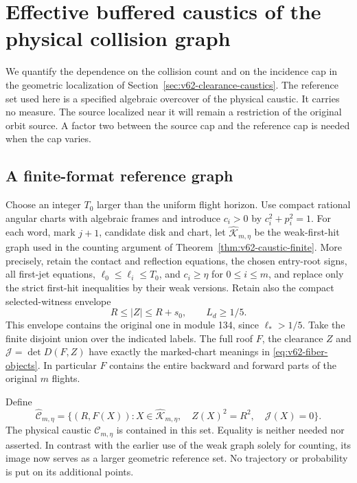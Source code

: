 \section{Effective buffered caustics of the physical collision graph}
\label{sec:v63-effective-caustics}
We quantify the dependence on the collision count and on the incidence
cap in the geometric localization of
Section~\ref{sec:v62-clearance-caustics}. The reference set used here
is a specified algebraic overcover of the physical caustic. It carries
no measure. The source localized near it will remain a restriction of
the original orbit source. A factor two between the source cap and the
reference cap is needed when the cap varies.

\subsection{A finite-format reference graph}
Choose an integer $T_0$ larger than the uniform flight horizon. Use
compact rational angular charts with algebraic frames and introduce
$c_i>0$ by $c_i^2+p_i^2=1$. For each word, mark $j+1$, candidate disk
and chart, let $\widehat{\mathcal K}_{m,\eta}$ be the weak-first-hit
graph used in the counting argument of
Theorem~\ref{thm:v62-caustic-finite}. More precisely, retain the contact
and reflection equations, the chosen entry-root signs, all first-jet
equations, $\ell_0\le\ell_i\le T_0$, and $c_i\ge\eta$ for
$0\le i\le m$, and replace only the strict first-hit inequalities by
their weak versions. Retain also the compact selected-witness envelope
\[
 R\le |Z|\le R+s_0,\qquad L_d\ge1/5.
\]
This envelope contains the original one in module 134, since
$\ell_*>1/5$. Take the finite disjoint union over the indicated labels.
The full roof $F$, the clearance $Z$ and
$\mathcal J=\det D(F,Z)$ have exactly the marked-chart meanings in
\eqref{eq:v62-fiber-objects}. In particular $F$ contains the entire
backward and forward parts of the original $m$ flights.

Define
\begin{equation}\label{eq:v63-overcover}
 \widehat{\mathcal C}_{m,\eta}
 =\{(R,F(X)):X\in\widehat{\mathcal K}_{m,\eta},\quad
                      Z(X)^2=R^2,\quad\mathcal J(X)=0\}.
\end{equation}
The physical caustic $\mathcal C_{m,\eta}$ is contained in this set.
Equality is neither needed nor asserted. In contrast with the earlier
use of the weak graph solely for counting, its image now serves as a
larger geometric reference set. No trajectory or probability is put on
its additional points.


